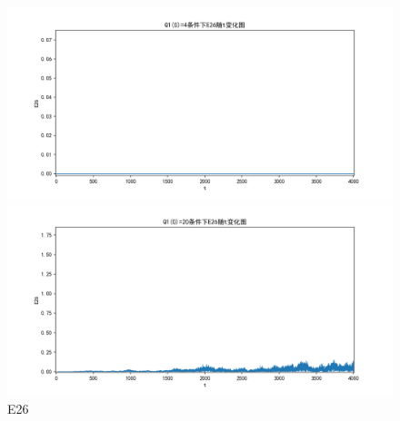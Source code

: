 \documentclass[10pt, a4paper]{article}
\begin{document}
    \begin{figure}[H]
        \begin{minipage}[t]{0.49\textwidth}
            \centering
            \includegraphics[width=\textwidth]{./q5_pics/cmp/E26.png}
        \end{minipage}
        \begin{minipage}[t]{0.49\textwidth}
            \centering
            \includegraphics[width=\textwidth]{./q5_pics/exp/E26.png}
        \end{minipage}
        \caption{E26}\label{fig:E26 in q5}
    \end{figure}
\end{document}
